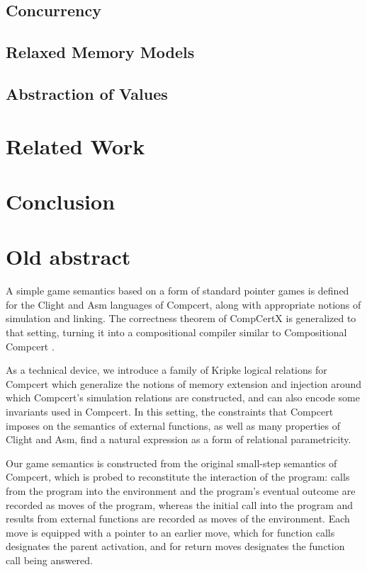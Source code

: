 \documentclass[sigplan,10pt,review,anonymous]{acmart}
\begin{document}
\subsection{Concurrency}
\subsection{Relaxed Memory Models}
\subsection{Abstraction of Values} %


\section{Related Work}
\section{Conclusion}




\appendix %

\section*{Old abstract}

A simple game semantics based on a form of standard pointer games
is defined for the Clight and Asm languages of Compcert,
along with appropriate notions of simulation and linking.
The correctness theorem of CompCertX \citep{popl15}
is generalized to that setting,
turning it into a compositional compiler
similar to Compositional Compcert \citep{compcomp}.

As a technical device,
we introduce a family of Kripke logical relations for Compcert
which generalize the notions of memory extension and injection
around which Compcert's simulation relations are constructed,
and can also encode some invariants used in Compcert.
In this setting,
the constraints that Compcert imposes on the semantics of external functions,
as well as many properties of Clight and Asm,
find a natural expression as a form of relational parametricity.

Our game semantics is constructed from the original
small-step semantics of Compcert,
which is probed to reconstitute the interaction of the program:
calls from the program into the environment and
the program's eventual outcome
are recorded as moves of the program,
whereas the initial call into the program and
results from external functions
are recorded as moves of the environment.
Each move is equipped with a pointer to an earlier move,
which for function calls designates the parent activation,
and for return moves designates the function call being answered.
\end{document}
